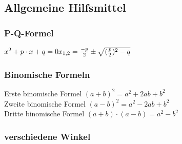 \documentclass[6pt,a4paper]{scrartcl}
\begin{document}
\begin{multicols*}{3}
\subsection{Allgemeine Hilfsmittel}
\subsubsection{P-Q-Formel}
$
x^2 + p\cdot x + q = 0\\
{x}_{1,2} = \frac{-p}{2} \pm \sqrt{(\frac{p}{2})^2 - q}
$
\subsubsection{Binomische Formeln}
Erste binomische Formel $(a+b)^{2}=a^{2} + 2ab + b^{2}$ \\
Zweite binomische Formel $(a-b)^{2}=a^{2} - 2ab + b^{2}$ \\
Dritte binomische Formel $(a+b)\cdot (a-b)=a^{2}-b^{2}$ \\

\subsubsection{verschiedene Winkel}



\end{multicols*}


\end{document}
